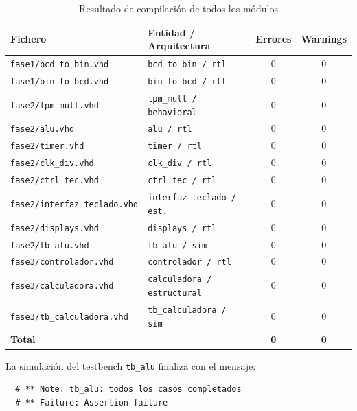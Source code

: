 \documentclass[memoria_final]{subfiles}
\begin{document}
\begin{table}[H]
  \centering
  \caption{Resultado de compilación de todos los módulos}
  \begin{tabular}{llcc}
    \toprule
    \textbf{Fichero} & \textbf{Entidad / Arquitectura} &
    \textbf{Errores} & \textbf{Warnings} \\
    \midrule
    \texttt{fase1/bcd\_to\_bin.vhd}      & \texttt{bcd\_to\_bin / rtl}        & 0 & 0 \\
    \texttt{fase1/bin\_to\_bcd.vhd}      & \texttt{bin\_to\_bcd / rtl}        & 0 & 0 \\
    \texttt{fase2/lpm\_mult.vhd}         & \texttt{lpm\_mult / behavioral}    & 0 & 0 \\
    \texttt{fase2/alu.vhd}               & \texttt{alu / rtl}                 & 0 & 0 \\
    \texttt{fase2/timer.vhd}             & \texttt{timer / rtl}               & 0 & 0 \\
    \texttt{fase2/clk\_div.vhd}          & \texttt{clk\_div / rtl}            & 0 & 0 \\
    \texttt{fase2/ctrl\_tec.vhd}         & \texttt{ctrl\_tec / rtl}           & 0 & 0 \\
    \texttt{fase2/interfaz\_teclado.vhd} & \texttt{interfaz\_teclado / est.}  & 0 & 0 \\
    \texttt{fase2/displays.vhd}          & \texttt{displays / rtl}            & 0 & 0 \\
    \texttt{fase2/tb\_alu.vhd}           & \texttt{tb\_alu / sim}             & 0 & 0 \\
    \texttt{fase3/controlador.vhd}       & \texttt{controlador / rtl}         & 0 & 0 \\
    \texttt{fase3/calculadora.vhd}       & \texttt{calculadora / estructural} & 0 & 0 \\
    \texttt{fase3/tb\_calculadora.vhd}   & \texttt{tb\_calculadora / sim}     & 0 & 0 \\
    \midrule
    \textbf{Total}                       & & \textbf{0} & \textbf{0} \\
    \bottomrule
  \end{tabular}
\end{table}

La simulación del testbench \texttt{tb\_alu} finaliza con el mensaje:

\begin{verbatim}
  # ** Note: tb_alu: todos los casos completados
  # ** Failure: Assertion failure
\end{verbatim}
\end{document}

